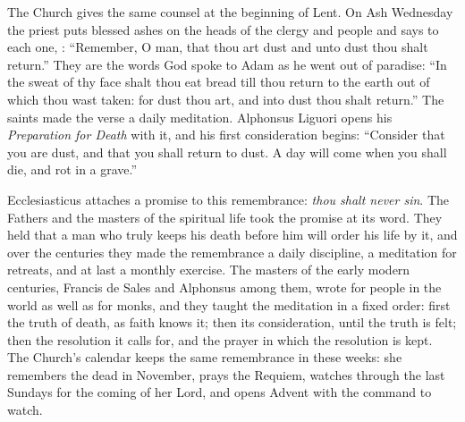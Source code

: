 The Church gives the same counsel at the beginning of Lent. On Ash Wednesday the priest puts blessed ashes on the heads of the clergy and people and says to each one, : ``Remember, O man, that thou art dust and unto dust thou shalt return.'' They are the words God spoke to Adam as he went out of paradise: ``In the sweat of thy face shalt thou eat bread till thou return to the earth out of which thou wast taken: for dust thou art, and into dust thou shalt return.'' The saints made the verse a daily meditation. Alphonsus Liguori opens his \emph{Preparation for Death} with it, and his first consideration begins: ``Consider that you are dust, and that you shall return to dust. A day will come when you shall die, and rot in a grave.''

Ecclesiasticus attaches a promise to this remembrance: \emph{thou shalt never sin}. The Fathers and the masters of the spiritual life took the promise at its word. They held that a man who truly keeps his death before him will order his life by it, and over the centuries they made the remembrance a daily discipline, a meditation for retreats, and at last a monthly exercise. The masters of the early modern centuries, Francis de Sales and Alphonsus among them, wrote for people in the world as well as for monks, and they taught the meditation in a fixed order: first the truth of death, as faith knows it; then its consideration, until the truth is felt; then the resolution it calls for, and the prayer in which the resolution is kept. The Church's calendar keeps the same remembrance in these weeks: she remembers the dead in November, prays the Requiem, watches through the last Sundays for the coming of her Lord, and opens Advent with the command to watch.
